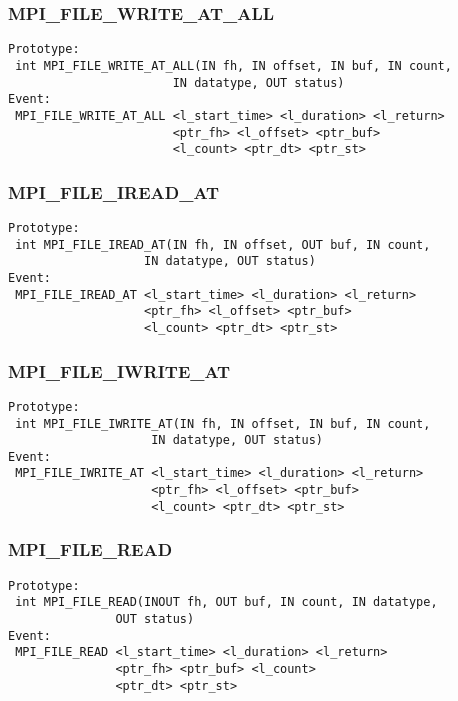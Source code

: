 \documentclass[9pt]{article}
\begin{document}
\subsubsection{MPI\_FILE\_WRITE\_AT\_ALL}
\label{sec:MPIFILEWRITEATALL}
\begin{verbatim}
Prototype:
 int MPI_FILE_WRITE_AT_ALL(IN fh, IN offset, IN buf, IN count, 
                       IN datatype, OUT status)
Event:
 MPI_FILE_WRITE_AT_ALL <l_start_time> <l_duration> <l_return>
                       <ptr_fh> <l_offset> <ptr_buf>
                       <l_count> <ptr_dt> <ptr_st>
\end{verbatim}

\subsubsection{MPI\_FILE\_IREAD\_AT}
\label{sec:MPIFILEIREADAT}
\begin{verbatim}
Prototype:
 int MPI_FILE_IREAD_AT(IN fh, IN offset, OUT buf, IN count, 
                   IN datatype, OUT status)
Event:
 MPI_FILE_IREAD_AT <l_start_time> <l_duration> <l_return>
                   <ptr_fh> <l_offset> <ptr_buf>
                   <l_count> <ptr_dt> <ptr_st>
\end{verbatim}

\subsubsection{MPI\_FILE\_IWRITE\_AT}
\label{sec:MPIFILEIWRITEAT}
\begin{verbatim}
Prototype:
 int MPI_FILE_IWRITE_AT(IN fh, IN offset, IN buf, IN count, 
                    IN datatype, OUT status)
Event:
 MPI_FILE_IWRITE_AT <l_start_time> <l_duration> <l_return>
                    <ptr_fh> <l_offset> <ptr_buf>
                    <l_count> <ptr_dt> <ptr_st>
\end{verbatim}

\subsubsection{MPI\_FILE\_READ}
\label{sec:MPIFILEREAD}
\begin{verbatim}
Prototype:
 int MPI_FILE_READ(INOUT fh, OUT buf, IN count, IN datatype, 
               OUT status)
Event:
 MPI_FILE_READ <l_start_time> <l_duration> <l_return>
               <ptr_fh> <ptr_buf> <l_count>
               <ptr_dt> <ptr_st>
\end{verbatim}
\end{document}
